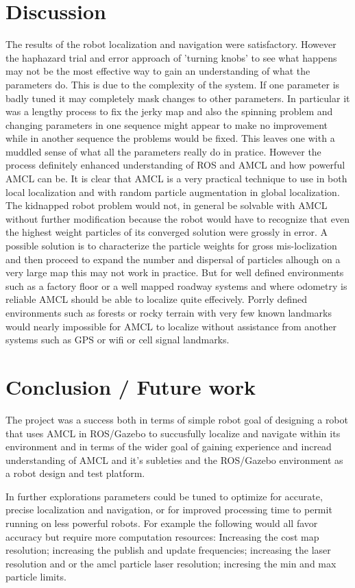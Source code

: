 \documentclass[10pt,journal,compsoc]{IEEEtran}
\begin{document}
\section{Discussion}
The results of the robot localization and navigation were satisfactory. However the haphazard trial and error approach of 'turning knobs' to see what happens may not be the most effective way to gain an understanding of what the parameters do. This is due to the complexity of the system. If one parameter is badly tuned it may completely mask changes to other parameters. In particular it was a lengthy process to fix the jerky map and also the spinning problem and changing parameters in one sequence might appear to make no improvement while in another sequence the problems would be fixed. This leaves one with a muddled sense of what all the parameters really do in pratice. However the process definitely enhanced understanding of ROS and AMCL and how powerful AMCL can be. It is clear that AMCL is a very practical technique to use in both local localization and with random particle augmentation in global localization. The kidnapped robot problem would not, in general be solvable with AMCL without further modification because the robot would have to recognize that even the highest weight particles of its converged solution were grossly in error. A possible solution is to characterize the particle weights for gross mis-loclization and then proceed to expand the number and dispersal of particles alhough on a very large map this may not work in practice. But for well defined environments such as a factory floor or a well mapped roadway systems and where odometry is reliable AMCL should be able to localize quite effecively. Porrly defined environments such as forests or rocky terrain with very few known landmarks would nearly impossible for AMCL to localize without assistance from another systems such as GPS or wifi or cell signal landmarks.

\section{Conclusion / Future work}
The project was a success both in terms of simple robot goal of designing a robot that uses AMCL in ROS/Gazebo to succusfully localize and navigate within its environment and in terms of the wider goal of gaining experience and incread understanding of AMCL and it's subleties and the ROS/Gazebo environment as a robot design and test platform. 

In further explorations parameters could be tuned to optimize for accurate, precise localization and navigation, or for improved processing time to permit running on less powerful robots. For example the following would all favor accuracy but require more computation resources: Increasing the cost map resolution; increasing the publish and update frequencies; increasing the laser resolution and or the amcl particle laser resolution; incresing the min and max particle limits.  
\end{document}
